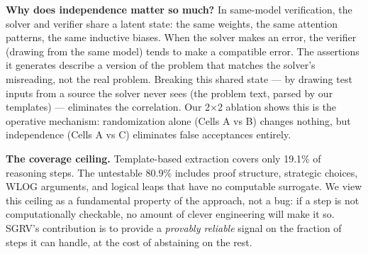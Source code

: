 \documentclass{article}
\begin{document}
\textbf{Why does independence matter so much?} In same-model verification, the solver and verifier share a latent state: the same weights, the same attention patterns, the same inductive biases. When the solver makes an error, the verifier (drawing from the same model) tends to make a compatible error. The assertions it generates describe a version of the problem that matches the solver's misreading, not the real problem. Breaking this shared state --- by drawing test inputs from a source the solver never sees (the problem text, parsed by our templates) --- eliminates the correlation. Our 2$\times$2 ablation shows this is the operative mechanism: randomization alone (Cells A vs B) changes nothing, but independence (Cells A vs C) eliminates false acceptances entirely.

\textbf{The coverage ceiling.} Template-based extraction covers only 19.1\% of reasoning steps. The untestable 80.9\% includes proof structure, strategic choices, WLOG arguments, and logical leaps that have no computable surrogate. We view this ceiling as a fundamental property of the approach, not a bug: if a step is not computationally checkable, no amount of clever engineering will make it so. SGRV's contribution is to provide a \emph{provably reliable} signal on the fraction of steps it can handle, at the cost of abstaining on the rest.
\end{document}
